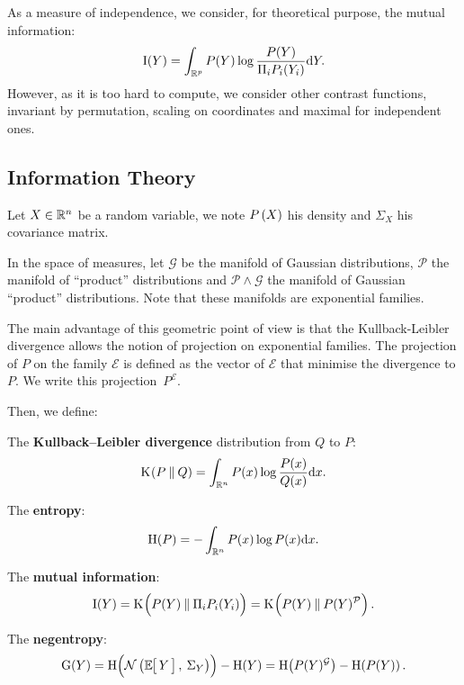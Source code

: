 \documentclass[a4paper]{article}
\newcommand{\Kl}[3][]{\mathrm K_{#1}\!\zp{#2\:\|\:#3}}
\newcommand{\zZ}[2]{\mathrm #1\!\zp{#2}}
\newcommand{\zD}{\mathcal}
\newcommand{\Ng}[2]{\mathcal{N}\zp{#1,\:#2}}
\begin{document}
As a measure of independence, we consider, for theoretical purpose,
the mutual information:\begin{equation}
  \zZ IY = \int_{\zR^p} P(Y) \log\frac{P(Y)}{\Pi_i P_i(Y_i)} \zdx Y.
\end{equation}
However, as it is too hard to compute, we consider other contrast functions, invariant by permutation, scaling on coordinates and maximal for independent ones.



\subsection{Information Theory}
\label{infth}
Let $X\in\mathbb{R}^n$ be a random variable, we note $P\zp{X}$ his density and $\Sigma_X$ his covariance matrix.
\znl

In the space of measures, let $\zD G$ be the manifold of Gaussian distributions, $\zD P$ the manifold of ``product'' distributions and $\zD P\wedge\zD G$ the manifold of Gaussian ``product'' distributions. Note that these manifolds are exponential families.

The main advantage of this geometric point of view is that the Kullback-Leibler divergence allows the notion of projection on exponential families. The projection of $P$ on the family $\zD E$ is defined as the vector of $\zD E$ that minimise the divergence to $P$. We write this projection~$P^{\zD E}$.

\znl

Then, we define:

The \textbf{Kullback--Leibler divergence} distribution from $Q$ to $P$:
\begin{equation}
  \Kl PQ = \int_{\zR^n} P(x) \log\frac{P(x)}{Q(x)} \zdx x.
\end{equation}

The \textbf{entropy}:\begin{equation}
  \zZ HP = - \int_{\zR^n} P(x)\log P(x) \zdx x.
\end{equation}

The \textbf{mutual information}:
\begin{equation}
  \zZ IY = \Kl {\zpbig2 P(Y)}{\Pi_i P_i(Y_i)} = \Kl {\zpbig2 P(Y)}{P(Y)^{\zD P}}.
\end{equation}

The \textbf{negentropy}:
\begin{equation}
  \zZ GY = \zZ H{\Ng{\zesp Y}{\Sigma_Y}\zpbig2}-\zZ HY= \zZ H{P(Y)^{\zD G}}-\zZ H{P(Y)}.
\end{equation}
\end{document}
